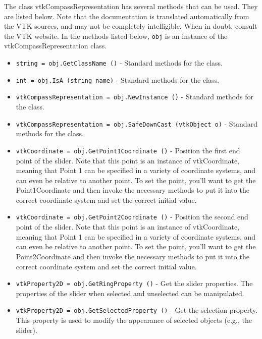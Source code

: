 The class vtkCompassRepresentation has several methods that can be used.
  They are listed below.
Note that the documentation is translated automatically from the VTK sources,
and may not be completely intelligible.  When in doubt, consult the VTK website.
In the methods listed below, \verb|obj| is an instance of the vtkCompassRepresentation class.
\begin{itemize}
\item  \verb|string = obj.GetClassName ()| -  Standard methods for the class.

\item  \verb|int = obj.IsA (string name)| -  Standard methods for the class.

\item  \verb|vtkCompassRepresentation = obj.NewInstance ()| -  Standard methods for the class.

\item  \verb|vtkCompassRepresentation = obj.SafeDownCast (vtkObject o)| -  Standard methods for the class.

\item  \verb|vtkCoordinate = obj.GetPoint1Coordinate ()| -  Position the first end point of the slider. Note that this point is an
 instance of vtkCoordinate, meaning that Point 1 can be specified in a
 variety of coordinate systems, and can even be relative to another
 point. To set the point, you'll want to get the Point1Coordinate and
 then invoke the necessary methods to put it into the correct coordinate
 system and set the correct initial value.

\item  \verb|vtkCoordinate = obj.GetPoint2Coordinate ()| -  Position the second end point of the slider. Note that this point is an
 instance of vtkCoordinate, meaning that Point 1 can be specified in a
 variety of coordinate systems, and can even be relative to another
 point. To set the point, you'll want to get the Point2Coordinate and
 then invoke the necessary methods to put it into the correct coordinate
 system and set the correct initial value.

\item  \verb|vtkProperty2D = obj.GetRingProperty ()| -  Get the slider properties. The properties of the slider when selected 
 and unselected can be manipulated.

\item  \verb|vtkProperty2D = obj.GetSelectedProperty ()| -  Get the selection property. This property is used to modify the
 appearance of selected objects (e.g., the slider).


\end{itemize}
